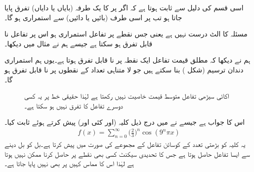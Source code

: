 اسی قسم کی دلیل سے ثابت ہوتا ہے کہ اگر  پر  کا یک طرفہ (بایاں یا دایاں) تفرق پایا جاتا ہو تب  پر  اسی طرف (بائیں یا دائیں) سے استمراری ہو گا۔

\quad مسئلہ  کا الٹ درست نہیں ہے یعنی جس نقطے پر تفاعل استمراری ہو اس پر تفاعل نا قابل تفرق ہو سکتا ہے جیسے ہم نے مثال  میں دیکھا۔

 ہم نے دیکھا کہ مطلق قیمت تفاعل  ایک نقطہ پر نا قابل تفرق ہوتا ہے۔یوں ہم استمراری دندان ترسیم (شکل ) بنا سکتے ہیں جو لا متناہی تعداد کے نقطوں پر نا قابل تفرق ہو گا۔
\begin{figure}
\centering
\begin{minipage}{0.45\textwidth}
\centering
{}
\caption{دندان ترسیم استمراری لیکن لا متناہی نقطوں پر نا قابل تفرق ہے۔}
\label{شکل_تفرق_دندان_ترسیم}
\end{minipage}\hfill
\begin{minipage}{0.45\textwidth}
\centering
{}
\caption{اکائی سیڑھی تفاعل متوسط قیمت خاصیت نہیں رکھتا ہے لہٰذا حقیقی خط پر یہ کسی دوسرے تفاعل کا تفرق نہیں ہو سکتا ہے۔}
\label{شکل_تفرق_اکائی_سیڑھی_تفاعل}
\end{minipage}
\end{figure}

 اس کا جواب ہے  جیسے   نے  میں درج ذیل کلیہ (اور کئی اور) پیش کرتے ہوئے ثابت کیا۔
\begin{align*}
f(x)=\sum_{n=0}^{\infty}\big(\frac{2}{3}\big)^n\cos (9^n\pi x)
\end{align*}
یہ کلیہ  کو  بڑھتی تعدد کے کوسائن تفاعل کے مجموعے کی صورت میں پیش کرتا ہے۔بل کو بل دینے سے ایسا تفاعل حاصل ہوتا ہے جس کا تحدیدی سیکنٹ کسی بھی نقطے پر حاصل کرنا ممکن نہیں ہوتا ہے لہٰذا اس کا مماس کہیں پر بھی نہیں پایا جاتا ہے۔ 

